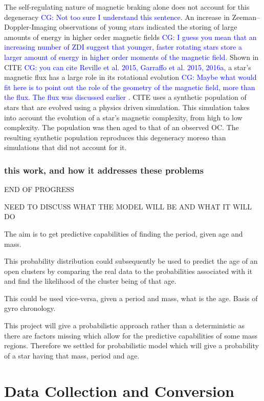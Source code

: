 \documentclass[fleqn,usenatbib]{mnras}
\begin{document}
The self-regulating nature of magnetic braking alone does not account for this degeneracy \textcolor{blue}{CG: Not too sure I understand this sentence}.
An increase in Zeeman–Doppler-Imaging observations of young stars indicated the storing of large amounts of energy in higher order magnetic fields \textcolor{blue}{CG: I guess you mean that an increasing number of ZDI suggest that younger, faster rotating stars store a larger amount of energy in higher order moments of the magnetic field}.
Shown in CITE \textcolor{blue}{CG: you can cite Reville et al. 2015, Garraffo et al. 2015, 2016a}, a star’s magnetic flux has a large role in its rotational evolution \textcolor{blue}{CG: Maybe what would fit here is to point out the role of the geometry of the magnetic field, more than the flux. The flux was discussed earlier} .
CITE uses a synthetic population of stars that are evolved using a physics driven simulation.
This simulation takes into account the evolution of a star’s magnetic complexity, from high to low complexity.
The population was then aged to that of an observed OC.
The resulting synthetic population reproduces this degeneracy moreso than simulations that did not account for it.

\subsubsection{this work, and how it addresses these problems}
END OF PROGRESS

NEED TO DISCUSS WHAT THE MODEL WILL BE AND WHAT IT WILL DO

The aim is to get predictive capabilities of finding the period, given age and mass.

This probability distribution could subsequently be used to predict the age of an open clusters by comparing the real data to the probabilities associated with it and find the likelihood of the cluster being of that age.

This could be used vice-versa, given a period and mass, what is the age. Basis of gyro chronology.

This project will give a probabilistic approach rather than a deterministic as there are factors missing which allow for the predictive capabilities of some mass regions. Therefore we settled for probabilistic model which will give a probability of a star having that mass, period and age.


\section{Data Collection and Conversion}
\end{document}

